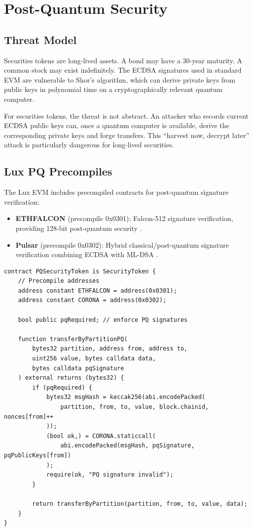 \section{Post-Quantum Security}
\label{sec:pq}

\subsection{Threat Model}

Securities tokens are long-lived assets. A bond may have a 30-year maturity. A common stock may exist indefinitely. The ECDSA signatures used in standard EVM are vulnerable to Shor's algorithm, which can derive private keys from public keys in polynomial time on a cryptographically relevant quantum computer.

For securities tokens, the threat is not abstract. An attacker who records current ECDSA public keys can, once a quantum computer is available, derive the corresponding private keys and forge transfers. This ``harvest now, decrypt later'' attack is particularly dangerous for long-lived securities.

\subsection{Lux PQ Precompiles}

The Lux EVM includes precompiled contracts for post-quantum signature verification:

\begin{itemize}[nosep]
  \item \textbf{ETHFALCON} (precompile 0x0301): Falcon-512 signature verification, providing 128-bit post-quantum security \cite{lux-ethfalcon-pq}.
  \item \textbf{Pulsar} (precompile 0x0302): Hybrid classical/post-quantum signature verification combining ECDSA with ML-DSA \cite{lux-mchain-mpc}.
\end{itemize}

\begin{lstlisting}[language=Solidity,caption={Post-quantum transfer verification.}]
contract PQSecurityToken is SecurityToken {
    // Precompile addresses
    address constant ETHFALCON = address(0x0301);
    address constant CORONA = address(0x0302);

    bool public pqRequired; // enforce PQ signatures

    function transferByPartitionPQ(
        bytes32 partition, address from, address to,
        uint256 value, bytes calldata data,
        bytes calldata pqSignature
    ) external returns (bytes32) {
        if (pqRequired) {
            bytes32 msgHash = keccak256(abi.encodePacked(
                partition, from, to, value, block.chainid, nonces[from]++
            ));
            (bool ok,) = CORONA.staticcall(
                abi.encodePacked(msgHash, pqSignature, pqPublicKeys[from])
            );
            require(ok, "PQ signature invalid");
        }

        return transferByPartition(partition, from, to, value, data);
    }
}
\end{lstlisting}

